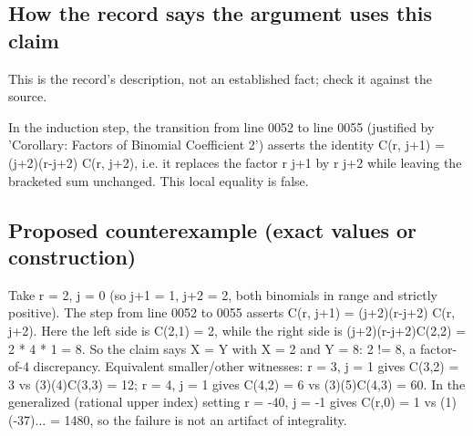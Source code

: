 \documentclass[11pt]{article}
\begin{document}
\subsection*{How the record says the argument uses this claim}
This is the record's description, not an established fact; check it against the source.
\begin{Vsrc}
In the induction step, the transition from line 0052 to line 0055 (justified by 'Corollary: Factors of Binomial Coefficient 2') asserts the identity C(r, j+1) = (j+2)(r-j+2) C(r, j+2), i.e. it replaces the factor \dbinom r {j+1} by \dbinom r {j+2} while leaving the bracketed sum unchanged. This local equality is false.
\end{Vsrc}
\subsection*{Proposed counterexample (exact values or construction)}
\begin{Vsrc}
Take r = 2, j = 0 (so j+1 = 1, j+2 = 2, both binomials in range and strictly positive). The step from line 0052 to 0055 asserts C(r, j+1) = (j+2)(r-j+2) C(r, j+2). Here the left side is C(2,1) = 2, while the right side is (j+2)(r-j+2)C(2,2) = 2 * 4 * 1 = 8. So the claim says X = Y with X = 2 and Y = 8: 2 != 8, a factor-of-4 discrepancy. Equivalent smaller/other witnesses: r = 3, j = 1 gives C(3,2) = 3 vs (3)(4)C(3,3) = 12; r = 4, j = 1 gives C(4,2) = 6 vs (3)(5)C(4,3) = 60. In the generalized (rational upper index) setting r = -40, j = -1 gives C(r,0) = 1 vs (1)(-37)... = 1480, so the failure is not an artifact of integrality.
\end{Vsrc}
\end{document}
